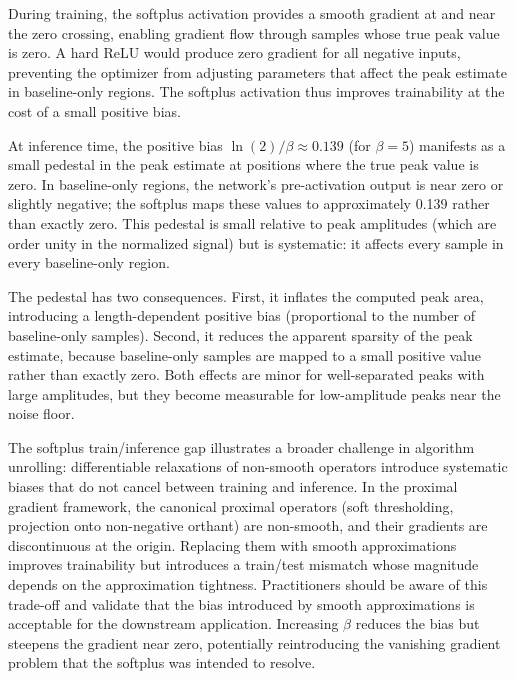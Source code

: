 During training, the softplus activation provides a smooth gradient at and near the zero crossing, enabling gradient flow through samples whose true peak value is zero. A hard ReLU would produce zero gradient for all negative inputs, preventing the optimizer from adjusting parameters that affect the peak estimate in baseline-only regions. The softplus activation thus improves trainability at the cost of a small positive bias.

At inference time, the positive bias $\ln(2)/\beta \approx 0.139$ (for $\beta = 5$) manifests as a small pedestal in the peak estimate at positions where the true peak value is zero. In baseline-only regions, the network's pre-activation output is near zero or slightly negative; the softplus maps these values to approximately 0.139 rather than exactly zero. This pedestal is small relative to peak amplitudes (which are order unity in the normalized signal) but is systematic: it affects every sample in every baseline-only region.

The pedestal has two consequences. First, it inflates the computed peak area, introducing a length-dependent positive bias (proportional to the number of baseline-only samples). Second, it reduces the apparent sparsity of the peak estimate, because baseline-only samples are mapped to a small positive value rather than exactly zero. Both effects are minor for well-separated peaks with large amplitudes, but they become measurable for low-amplitude peaks near the noise floor.

The softplus train/inference gap illustrates a broader challenge in algorithm unrolling: differentiable relaxations of non-smooth operators introduce systematic biases that do not cancel between training and inference. In the proximal gradient framework, the canonical proximal operators (soft thresholding, projection onto non-negative orthant) are non-smooth, and their gradients are discontinuous at the origin. Replacing them with smooth approximations improves trainability but introduces a train/test mismatch whose magnitude depends on the approximation tightness. Practitioners should be aware of this trade-off and validate that the bias introduced by smooth approximations is acceptable for the downstream application. Increasing $\beta$ reduces the bias but steepens the gradient near zero, potentially reintroducing the vanishing gradient problem that the softplus was intended to resolve.



